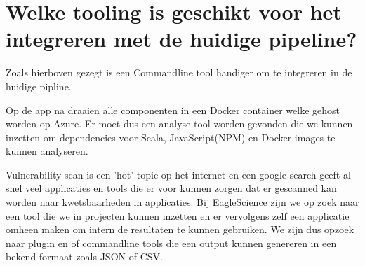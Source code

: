 \section{Welke tooling is geschikt voor het integreren met de huidige pipeline? }
Zoals hierboven gezegt is een Commandline tool handiger om te integreren in de huidige pipline.

Op de app na draaien alle componenten in een Docker container welke gehost worden op Azure. Er moet dus een analyse tool worden gevonden die we kunnen inzetten om dependencies voor Scala, JavaScript(NPM) en Docker images te kunnen analyseren.

Vulnerability scan is een 'hot' topic op het internet en een google search geeft al snel veel applicaties en tools die er voor kunnen zorgen dat er gescanned kan worden naar kwetsbaarheden in applicaties. Bij EagleScience zijn we op zoek naar een tool die we in projecten kunnen inzetten en er vervolgens zelf een applicatie omheen maken om intern de resultaten te kunnen gebruiken. We zijn dus opzoek naar plugin en of commandline tools die een output kunnen genereren in een bekend formaat zoals JSON of CSV.
